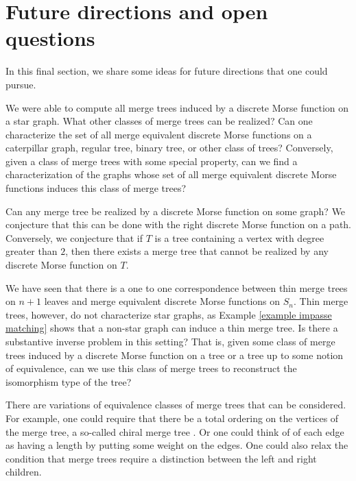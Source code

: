 \documentclass{article}
\theoremstyle{definition}
\begin{document}
\section{Future directions and open questions}\label{Conclusion and future work}

In this final section, we share some ideas for future directions that one could pursue.

We were able to compute all merge trees induced by a discrete Morse function on a star graph.  What other classes of merge trees can be realized?  Can one characterize the set of all merge equivalent discrete Morse functions on a caterpillar graph, regular tree, binary tree, or other class of trees? Conversely, given a class of merge trees with some special property, can we find a characterization of the graphs whose set of all merge equivalent discrete Morse functions induces this class of merge trees?

Can any merge tree be realized by a discrete Morse function on some graph?  We conjecture that this can be done with the right discrete Morse function on a path. Conversely, we conjecture that if $T$ is a tree containing a vertex with degree greater than $2$, then there exists a merge tree that cannot be realized by any discrete Morse function on $T$.

We have seen that there is a one to one correspondence between thin merge trees on $n+1$ leaves and merge equivalent discrete Morse functions on $S_n$.  Thin merge trees, however, do not characterize star graphs, as Example \ref{example impasse matching} shows that a non-star graph can induce a thin merge tree.  Is there a substantive inverse problem in this setting?  That is, given some class of merge trees induced by a discrete Morse function on a tree or a tree up to some notion of equivalence, can we use this class of merge trees to reconstruct the isomorphism type of the tree?

There are variations of equivalence classes of merge trees that can be considered.  For example, one could require that there be a total ordering on the vertices of the merge tree, a so-called chiral merge tree \cite{Curry-2017}.  Or one could think of of each edge as having a length by putting some weight on the edges.  One could also relax the condition that merge trees require a distinction between the left and right children.



\end{document}
